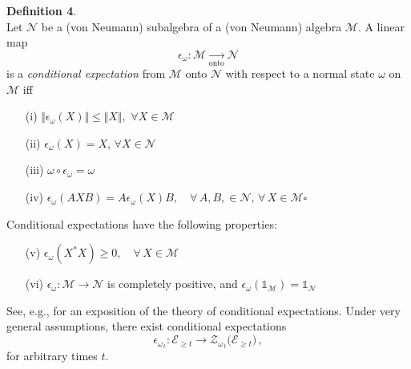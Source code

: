 \documentclass[12pt]{article}
\begin{document}
\begin{enumerate}
{ {\bf{Definition 4}}. \\
 Let $\mathcal{N}$ be a (von Neumann) subalgebra of a (von Neumann) algebra $\mathcal{M}$. A linear map 
 \begin{equation} \label{condexp}
 \epsilon_{\omega} : \mathcal{M} \underset{\text{onto}}{\rightarrow} \mathcal{N}
 \end{equation}
 is a \textit{conditional expectation} from $\mathcal{M}$ onto $\mathcal{N}$ with respect to a normal state $\omega$ on 
 $\mathcal{M}$ iff
\begin{enumerate}
\item[(i)]{$\Vert \epsilon_{\omega} (X) \Vert \leq \Vert X \Vert,$ \quad $\forall X \in \mathcal{M}$}
\item[(ii)]{ $\epsilon_{\omega}(X) = X$, \quad $\forall X \in \mathcal{N}$}
\item[(iii)]{ $\omega \circ \epsilon_{\omega} = \omega$} 
\item[(iv)]{$\epsilon_{\omega}(AXB)= A \epsilon_{\omega}(X) B, \quad \forall \, A, B, \in \mathcal{N}, \, \forall \, X \in \mathcal{M}$}\hspace{2.8cm}$\square$
 \end{enumerate}

Conditional expectations have the following properties:
\begin{enumerate}
\item[(v)]{$ \epsilon_{\omega}(X^{*}X) \geq 0, \quad \forall \,X \in \mathcal{M}$}
\item[(vi)]{$\epsilon_{\omega} : \mathcal{M} \rightarrow \mathcal{N}$ is completely positive, and 
$\epsilon_{\omega}({\mathds{1}}_{\mathcal{M}})= {\mathds{1}}_{\mathcal{N}}$}
\end{enumerate}
 See, e.g., \cite{Takesaki} for an exposition of the theory of conditional expectations. Under very general assumptions, there exist conditional expectations
 \begin{equation}\label{condexp}
\epsilon_{\omega_{\,t}}: \mathcal{E}_{\geq t} \rightarrow \mathcal{Z}_{\omega_{\,t}}\big(\mathcal{E}_{\geq t}\big)\,,
\end{equation}
 for arbitrary times $t$.
 
}
\end{enumerate}
\end{document}
